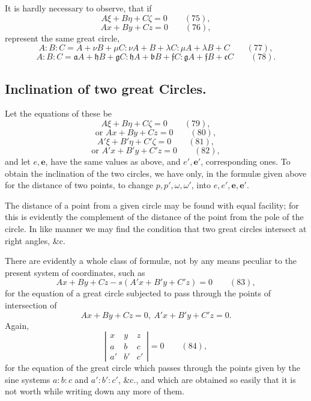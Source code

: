 \documentclass[11pt]{article}
\begin{document}
\newpage
\setcounter{page}{220}

It is hardly necessary to observe, that if
\[
A\xi + B\eta + C\zeta = 0 \qquad (75),
\]
\[
Ax + By + Cz = 0 \qquad (76),
\]
represent the same great circle,
\[
A : B : C = A + \nu B + \mu C : \nu A + B + \lambda C : \mu A + \lambda B + C \qquad (77),
\]
\[
A : B : C = \mathfrak{a}A + \mathfrak{h}B + \mathfrak{g}C : \mathfrak{h}A + \mathfrak{b}B + \mathfrak{f}C : \mathfrak{g}A + \mathfrak{f}B + \mathfrak{c}C \qquad (78).
\]

\subsection*{Inclination of two great Circles.}

Let the equations of these be
\[
A\xi + B\eta + C\zeta = 0 \qquad (79),
\]
\[
\text{or } Ax + By + Cz = 0 \qquad (80),
\]
\[
A'\xi + B'\eta + C'\zeta = 0 \qquad (81),
\]
\[
\text{or } A'x + B'y + C'z = 0 \qquad (82),
\]
and let $e, \mathbf{e}$, have the same values as above, and $e', \mathbf{e}'$, corresponding ones. To obtain the inclination of the two circles, we have only, in the formul\ae{} given above for the distance of two points, to change $p, p', \omega, \omega'$, into $e, e', \mathbf{e}, \mathbf{e}'$.

The distance of a point from a given circle may be found with equal facility; for this is evidently the complement of the distance of the point from the pole of the circle. In like manner we may find the condition that two great circles intersect at right angles, \&c.

There are evidently a whole class of formul\ae, not by any means peculiar to the present system of coordinates, such as
\[
Ax + By + Cz - s(A'x + B'y + C'z) = 0 \qquad (83),
\]
for the equation of a great circle subjected to pass through the points of intersection of
\[
Ax + By + Cz = 0,\ A'x + B'y + C'z = 0.
\]
Again,
\[
\left| \begin{array}{ccc}
x & y & z\\
a & b & c\\
a' & b' & c'
\end{array} \right| = 0 \qquad (84),
\]
for the equation of the great circle which passes through the points given by the sine systems $a : b : c$ and $a' : b' : c'$, \&c., and which are obtained so easily that it is not worth while writing down any more of them.
\end{document}
